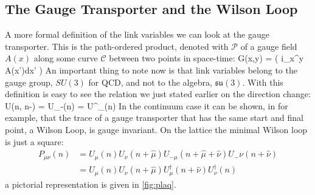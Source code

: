 \subsection{The Gauge Transporter and the Wilson Loop}
A more formal definition of the link variables we can look at the gauge transporter. This is the path-ordered product, denoted with $\mathcal{P}$ of a gauge field $A(x)$ along some curve $\mathcal{C}$ between two points in space-time:
\beq
    G(x,y) =  \exp\left( i\int_x^y A(x')dx'  \right)
\eeq
An important thing to note now is that link variables belong to the gauge group, $SU(3)$ for QCD, and not to the algebra, $\mathfrak{su}(3)$. With this definition is easy to see the relation we just stated earlier on the direction change:
\beq
    U(n, n-\hat\mu) = U_{-\mu}(n) = U^\dagger_\mu(n)
\eeq
In the continuum case it can be shown, in \cite{peskin} for example, that the trace of a gauge transporter that has the same start and final point, a Wilson Loop, is gauge invariant. On the lattice the minimal Wilson loop is just a square:
\begin{align}
P_{\mu\nu}(n) &= U_\mu(n) U_\nu(n+\hat\mu) U_{-\mu}(n+\hat\mu+\hat\nu) U_-{\nu}(n+\hat\nu)  \\\nonumber
              &= U_\mu(n) U_\nu(n+\hat\mu) U^\dagger_\mu(n+\hat\nu) U^\dagger_\nu(n)
\label{plaquette}
\end{align}
a pictorial representation is given in \cref{fig:plaq}.
